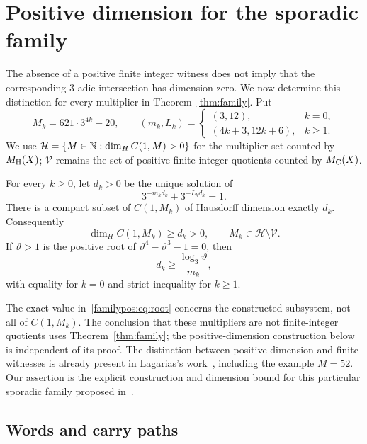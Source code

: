 \section{Positive dimension for the sporadic family}
\label{familypos:section}

The absence of a positive finite integer witness does not imply that
the corresponding $3$-adic intersection has dimension zero. We now
determine this distinction for every multiplier in
Theorem~\ref{thm:family}. Put
\[
 M_k=621\cdot3^{4k}-20,\qquad
 (m_k,L_k)=
 \begin{cases}(3,12),&k=0,\\(4k+3,12k+6),&k\ge1.\end{cases}
\]
We use $\mathcal H=\{M\in\mathbb N:\dim_H C(1,M)>0\}$ for the
multiplier set counted by $M_{\mathrm H}(X)$; $\mathcal V$ remains the set
of positive finite-integer quotients counted by $M_{\mathrm C}(X)$.

\begin{theorem}
\label{familypos:main}
For every $k\ge0$, let $d_k>0$ be the unique solution of
\begin{equation}\label{familypos:eq:root}
             3^{-m_kd_k}+3^{-L_kd_k}=1.
\end{equation}
There is a compact subset of $C(1,M_k)$ of Hausdorff dimension
exactly $d_k$. Consequently
\[
             \dim_H C(1,M_k)\ge d_k>0,
             \qquad M_k\in\mathcal H\setminus\mathcal V.
\]
If $\vartheta>1$ is the positive root of
$\vartheta^4-\vartheta^3-1=0$, then
\begin{equation}\label{familypos:eq:theta}
 d_k\ge\frac{\log_3\vartheta}{m_k},
\end{equation}
with equality for $k=0$ and strict inequality for $k\ge1$.
\end{theorem}

The exact value in~\eqref{familypos:eq:root} concerns the constructed
subsystem, not all of $C(1,M_k)$. The conclusion that these multipliers
are not finite-integer quotients uses Theorem~\ref{thm:family}; the
positive-dimension construction below is independent of its proof.
The distinction between positive dimension and finite witnesses is
already present in Lagarias's work~\cite{Lagarias}, including the
example $M=52$. Our assertion is the explicit construction and
dimension bound for this particular sporadic family proposed
in~\cite[\S1.4]{BMRS}.

\subsection{Words and carry paths}

